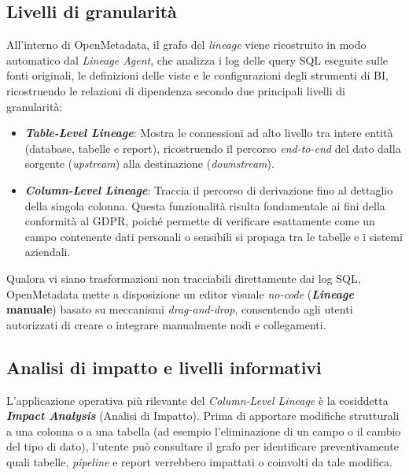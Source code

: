 \subsection{Livelli di granularità}
All'interno di OpenMetadata, il grafo del \emph{lineage} viene ricostruito in modo automatico dal \emph{Lineage Agent}, che analizza i log delle query SQL 
eseguite sulle fonti originali, le definizioni delle viste e le configurazioni degli strumenti di BI, ricostruendo le relazioni di dipendenza secondo due principali livelli di granularità:
\begin{itemize}
    \item \textbf{\emph{Table-Level Lineage}}: Mostra le connessioni ad alto livello tra intere entità (database, tabelle e report), ricostruendo il percorso \emph{end-to-end} del dato dalla sorgente (\emph{upstream}) alla destinazione (\emph{downstream}).
    \item \textbf{\emph{Column-Level Lineage}}: Traccia il percorso di derivazione fino al dettaglio della singola colonna. Questa funzionalità risulta fondamentale ai fini della conformità al GDPR, poiché permette di verificare esattamente come un campo contenente dati personali o sensibili si propaga tra le tabelle e i sistemi aziendali.
\end{itemize}

\noindent Qualora vi siano trasformazioni non tracciabili direttamente dai log SQL, OpenMetadata mette a disposizione un editor visuale \emph{no-code} (\textbf{\emph{Lineage} manuale}) 
basato su meccanismi \emph{drag-and-drop}, consentendo agli utenti autorizzati di creare o integrare manualmente nodi e collegamenti.

\subsection{Analisi di impatto e livelli informativi}
L'applicazione operativa più rilevante del \emph{Column-Level Lineage} è la cosiddetta \textbf{\emph{Impact Analysis}} (Analisi di Impatto). 
Prima di apportare modifiche strutturali a una colonna o a una tabella (ad esempio l'eliminazione di un campo o il cambio del tipo di dato), l'utente può consultare il grafo 
per identificare preventivamente quali tabelle, \emph{pipeline} e report verrebbero impattati o coinvolti da tale modifica.

